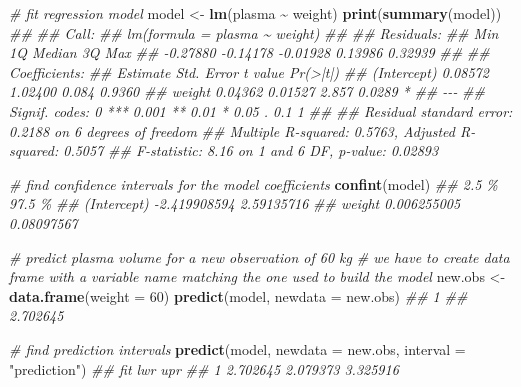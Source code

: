 \documentclass[
]{book}
\newenvironment{Shaded}{\begin{snugshade}}{\end{snugshade}}
\newcommand{\CommentTok}[1]{\textcolor[rgb]{0.56,0.35,0.01}{\textit{#1}}}
\newcommand{\DataTypeTok}[1]{\textcolor[rgb]{0.13,0.29,0.53}{#1}}
\newcommand{\DecValTok}[1]{\textcolor[rgb]{0.00,0.00,0.81}{#1}}
\newcommand{\KeywordTok}[1]{\textcolor[rgb]{0.13,0.29,0.53}{\textbf{#1}}}
\newcommand{\NormalTok}[1]{#1}
\newcommand{\OperatorTok}[1]{\textcolor[rgb]{0.81,0.36,0.00}{\textbf{#1}}}
\newcommand{\StringTok}[1]{\textcolor[rgb]{0.31,0.60,0.02}{#1}}
\theoremstyle{definition}
\theoremstyle{definition}
\theoremstyle{definition}
\theoremstyle{remark}
\begin{document}
\begin{Shaded}
\begin{Highlighting}[]
\CommentTok{\# fit regression model}
\NormalTok{model \textless{}{-}}\StringTok{ }\KeywordTok{lm}\NormalTok{(plasma }\OperatorTok{\textasciitilde{}}\StringTok{ }\NormalTok{weight)}
\KeywordTok{print}\NormalTok{(}\KeywordTok{summary}\NormalTok{(model))}
\CommentTok{\#\# }
\CommentTok{\#\# Call:}
\CommentTok{\#\# lm(formula = plasma \textasciitilde{} weight)}
\CommentTok{\#\# }
\CommentTok{\#\# Residuals:}
\CommentTok{\#\#      Min       1Q   Median       3Q      Max }
\CommentTok{\#\# {-}0.27880 {-}0.14178 {-}0.01928  0.13986  0.32939 }
\CommentTok{\#\# }
\CommentTok{\#\# Coefficients:}
\CommentTok{\#\#             Estimate Std. Error t value Pr(\textgreater{}|t|)  }
\CommentTok{\#\# (Intercept)  0.08572    1.02400   0.084   0.9360  }
\CommentTok{\#\# weight       0.04362    0.01527   2.857   0.0289 *}
\CommentTok{\#\# {-}{-}{-}}
\CommentTok{\#\# Signif. codes:  0 \textquotesingle{}***\textquotesingle{} 0.001 \textquotesingle{}**\textquotesingle{} 0.01 \textquotesingle{}*\textquotesingle{} 0.05 \textquotesingle{}.\textquotesingle{} 0.1 \textquotesingle{} \textquotesingle{} 1}
\CommentTok{\#\# }
\CommentTok{\#\# Residual standard error: 0.2188 on 6 degrees of freedom}
\CommentTok{\#\# Multiple R{-}squared:  0.5763,	Adjusted R{-}squared:  0.5057 }
\CommentTok{\#\# F{-}statistic:  8.16 on 1 and 6 DF,  p{-}value: 0.02893}

\CommentTok{\# find confidence intervals for the model coefficients}
\KeywordTok{confint}\NormalTok{(model)}
\CommentTok{\#\#                    2.5 \%     97.5 \%}
\CommentTok{\#\# (Intercept) {-}2.419908594 2.59135716}
\CommentTok{\#\# weight       0.006255005 0.08097567}

\CommentTok{\# predict plasma volume for a new observation of 60 kg}
\CommentTok{\# we have to create data frame with a variable name matching the one used to build the model }
\NormalTok{new.obs \textless{}{-}}\StringTok{ }\KeywordTok{data.frame}\NormalTok{(}\DataTypeTok{weight =} \DecValTok{60}\NormalTok{)  }
\KeywordTok{predict}\NormalTok{(model, }\DataTypeTok{newdata =}\NormalTok{ new.obs) }
\CommentTok{\#\#        1 }
\CommentTok{\#\# 2.702645}

\CommentTok{\# find prediction intervals}
\KeywordTok{predict}\NormalTok{(model, }\DataTypeTok{newdata =}\NormalTok{ new.obs,  }\DataTypeTok{interval =} \StringTok{"prediction"}\NormalTok{)}
\CommentTok{\#\#        fit      lwr      upr}
\CommentTok{\#\# 1 2.702645 2.079373 3.325916}


\end{Highlighting}
\end{Shaded}
\end{document}
